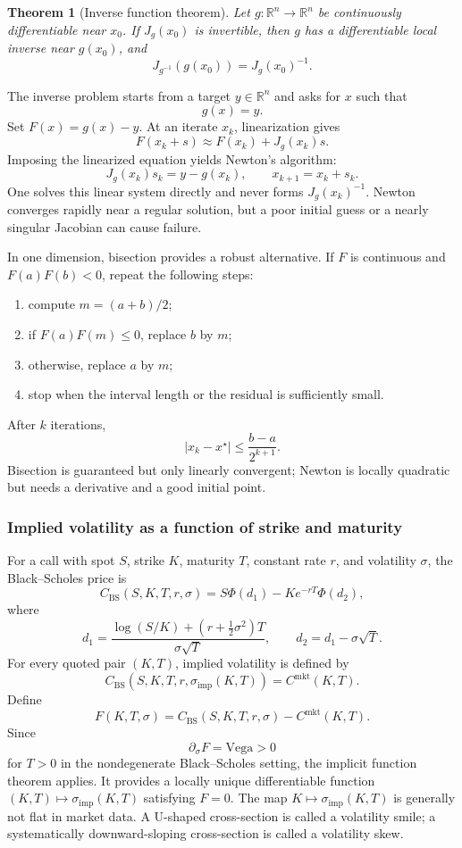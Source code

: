 \documentclass[11pt]{article}
\newcommand{\R}{\mathbb{R}}
\theoremstyle{definition}
\theoremstyle{plain}
\newtheorem{theorem}[definition]{Theorem}
\theoremstyle{remark}
\begin{document}
\begin{theorem}[Inverse function theorem]
Let $g:\R^n\to\R^n$ be continuously differentiable near $x_0$. If
$J_g(x_0)$ is invertible, then $g$ has a differentiable local inverse near
$g(x_0)$, and
\[
J_{g^{-1}}(g(x_0))=J_g(x_0)^{-1}.
\]
\end{theorem}

The inverse problem starts from a target $y\in\R^n$ and asks for $x$ such that
\[
\boxed{g(x)=y.}
\]
Set $F(x)=g(x)-y$. At an iterate $x_k$, linearization gives
\[
F(x_k+s)\approx F(x_k)+J_g(x_k)s.
\]
Imposing the linearized equation yields Newton's algorithm:
\[
\boxed{J_g(x_k)s_k=y-g(x_k)},
\qquad
\boxed{x_{k+1}=x_k+s_k}.
\]
One solves this linear system directly and never forms $J_g(x_k)^{-1}$.
Newton converges rapidly near a regular solution, but a poor initial guess or
a nearly singular Jacobian can cause failure.

In one dimension, bisection provides a robust alternative. If $F$ is
continuous and $F(a)F(b)<0$, repeat the following steps:
\begin{enumerate}
\item compute $m=(a+b)/2$;
\item if $F(a)F(m)\leq0$, replace $b$ by $m$;
\item otherwise, replace $a$ by $m$;
\item stop when the interval length or the residual is sufficiently small.
\end{enumerate}
After $k$ iterations,
\[
|x_k-x^\star|\leq\frac{b-a}{2^{k+1}}.
\]
Bisection is guaranteed but only linearly convergent; Newton is locally
quadratic but needs a derivative and a good initial point.

\subsubsection*{Implied volatility as a function of strike and maturity}

For a call with spot $S$, strike $K$, maturity $T$, constant rate $r$, and
volatility $\sigma$, the Black--Scholes price is
\[
C_{\mathrm{BS}}(S,K,T,r,\sigma)
=S\Phi(d_1)-Ke^{-rT}\Phi(d_2),
\]
where
\[
d_1=\frac{\log(S/K)+(r+\tfrac12\sigma^2)T}{\sigma\sqrt T},
\qquad
d_2=d_1-\sigma\sqrt T.
\]
For every quoted pair $(K,T)$, implied volatility is defined by
\[
\boxed{C_{\mathrm{BS}}(S,K,T,r,\sigma_{\mathrm{imp}}(K,T))
=C^{\mathrm{mkt}}(K,T).}
\]
Define
\[
F(K,T,\sigma)
=C_{\mathrm{BS}}(S,K,T,r,\sigma)-C^{\mathrm{mkt}}(K,T).
\]
Since
\[
\partial_\sigma F=\mathrm{Vega}>0
\]
for $T>0$ in the nondegenerate Black--Scholes setting, the implicit function
theorem applies. It provides a locally unique differentiable function
$(K,T)\mapsto\sigma_{\mathrm{imp}}(K,T)$ satisfying $F=0$.
The map $K\mapsto\sigma_{\mathrm{imp}}(K,T)$ is generally not flat in market
data. A U-shaped cross-section is called a volatility smile; a systematically
downward-sloping cross-section is called a volatility skew.
\end{document}
